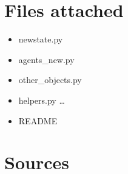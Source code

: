 \documentclass{article}
\begin{document}
\section{Files attached}
\begin{itemize}
\item newstate.py
\item agents\_new.py
\item other\_objects.py
\item helpers.py \ldots
\item README
\end{itemize}

\section{Sources}



\end{document}
